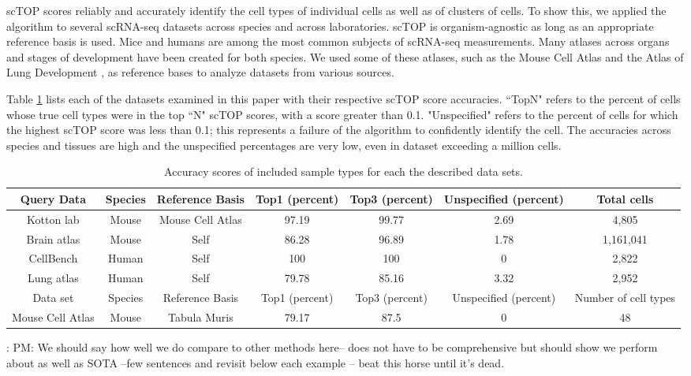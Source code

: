 \documentclass[aps,superscriptaddress, notitlepage,longbibliography]{revtex4-1}
\begin{document}
scTOP scores reliably and accurately identify the cell types of individual cells as well as of clusters of cells. To show this, we applied the algorithm to several scRNA-seq datasets across species and across laboratories. scTOP is organism-agnostic as long as an appropriate reference basis is used. Mice and humans are among the most common subjects of scRNA-seq measurements. Many atlases across organs and stages of development have been created for both species. We used some of these atlases, such as the Mouse Cell Atlas \cite{noauthor_mapping_nodate} and the Atlas of Lung Development \cite{negretti_single-cell_2021}, as reference bases to analyze datasets from various sources.

Table \ref{table:1} lists each of the datasets examined in this paper with their respective scTOP score accuracies. ``TopN" refers to the percent of cells whose true cell types were in the top ``N" scTOP scores, with a score greater than 0.1. "Unspecified" refers to the percent of cells for which the highest scTOP score was less than 0.1; this represents a failure of the algorithm to confidently identify the cell. The accuracies across species and tissues are high and the unspecified percentages are very low, even in dataset exceeding a million cells.

\begin{table}[h!]
\centering
\begin{tabular}{| c | c | c | c | c | c | c |}
\hline
Query Data & Species & Reference Basis & Top1 (percent) & Top3 (percent) & Unspecified (percent) & Total cells \\ 
\hline
Kotton lab & Mouse & Mouse Cell Atlas & 97.19 & 99.77 & 2.69 & 4,805 \\ 
\hline
Brain atlas & Mouse & Self & 86.28 & 96.89 & 1.78 & 1,161,041 \\
\hline
CellBench & Human & Self & 100 & 100 & 0 & 2,822 \\
\hline
Lung atlas & Human & Self & 79.78 & 85.16 & 3.32 & 2,952 \\  
\hline
\hline
Data set & Species & Reference Basis & Top1 (percent) & Top3 (percent) & Unspecified (percent) & Number of cell types \\
\hline
Mouse Cell Atlas & Mouse & Tabula Muris & 79.17 & 87.5 & 0 & 48 \\
\hline

\end{tabular}
\caption{Accuracy scores of included sample types for each the described data sets.}
\label{table:1}
\end{table}
{\color{red}: PM: We should say how well we do compare to other methods here-- does not have to be comprehensive but should show we perform about as well as SOTA --few sentences and revisit below each example -- beat this horse until it's dead.}
\end{document}
